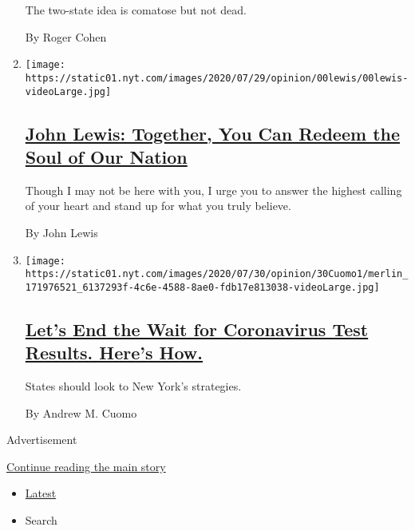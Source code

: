 \begin{enumerate}
  The two-state idea is comatose but not dead.

  By Roger Cohen
\item
  \texttt{[image: https://static01.nyt.com/images/2020/07/29/opinion/00lewis/00lewis-videoLarge.jpg]}

  \hypertarget{john-lewis-together-you-can-redeem-the-soul-of-our-nation}{%
  \subsection{\texorpdfstring{\href{/2020/07/30/opinion/john-lewis-civil-rights-america.html}{John
  Lewis: Together, You Can Redeem the Soul of Our
  Nation}}{John Lewis: Together, You Can Redeem the Soul of Our Nation}}\label{john-lewis-together-you-can-redeem-the-soul-of-our-nation}}

  Though I may not be here with you, I urge you to answer the highest
  calling of your heart and stand up for what you truly believe.

  By John Lewis
\item
  \texttt{[image: https://static01.nyt.com/images/2020/07/30/opinion/30Cuomo1/merlin\_171976521\_6137293f-4c6e-4588-8ae0-fdb17e813038-videoLarge.jpg]}

  \hypertarget{lets-end-the-wait-for-coronavirus-test-results-heres-how}{%
  \subsection{\texorpdfstring{\href{/2020/07/31/opinion/coronavirus-testing-cuomo.html}{Let's
  End the Wait for Coronavirus Test Results. Here's
  How.}}{Let's End the Wait for Coronavirus Test Results. Here's How.}}\label{lets-end-the-wait-for-coronavirus-test-results-heres-how}}

  States should look to New York's strategies.

  By Andrew M. Cuomo
\end{enumerate}

Advertisement

\protect\hyperlink{after-mid1}{Continue reading the main story}

\begin{itemize}
\tightlist
\item
  \protect\hyperlink{stream-panel}{Latest}
\item
  Search
\end{itemize}

